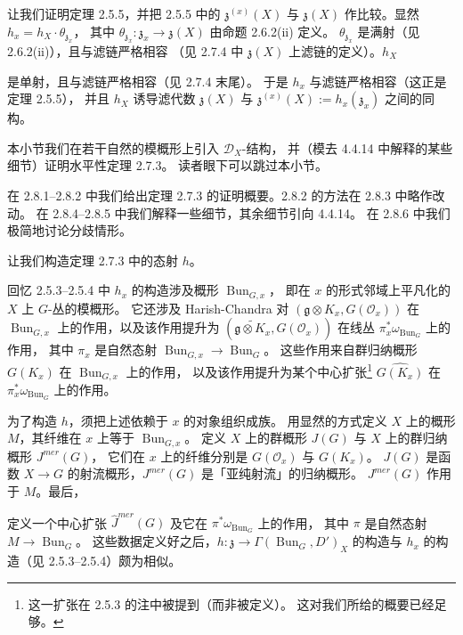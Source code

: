  让我们证明定理 2.5.5，并把 2.5.5 中的 $\mathfrak{z}^{(x)}(X)$
与 $\mathfrak{z}(X)$ 作比较。显然 $h_x=h_X\cdot\theta_{\mathfrak{z}_x}$，
其中 $\theta_{\mathfrak{z}_x}:\mathfrak{z}_x\to\mathfrak{z}(X)$ 由命题 2.6.2(ii) 定义。
$\theta_{\mathfrak{z}_x}$ 是满射（见 2.6.2(ii)），且与滤链严格相容
（见 2.7.4 中 $\mathfrak{z}(X)$ 上滤链的定义）。$h_X$


是单射，且与滤链严格相容（见 2.7.4 末尾）。
于是 $h_x$ 与滤链严格相容（这正是定理 2.5.5），
并且 $h_X$ 诱导滤代数 $\mathfrak{z}(X)$ 与
$\mathfrak{z}^{(x)}(X):=h_x(\mathfrak{z}_x)$ 之间的同构。

 本小节我们在若干自然的模概形上引入 $\mathcal{D}_X$-结构，
并（模去 4.4.14 中解释的某些细节）证明水平性定理 2.7.3。
读者眼下可以跳过本小节。

在 2.8.1--2.8.2 中我们给出定理 2.7.3 的证明概要。2.8.2 的方法在 2.8.3 中略作改动。
在 2.8.4--2.8.5 中我们解释一些细节，其余细节引向 4.4.14。
在 2.8.6 中我们极简地讨论分歧情形。

 让我们构造定理 2.7.3 中的态射 $h$。

回忆 2.5.3--2.5.4 中 $h_x$ 的构造涉及概形 $\operatorname{Bun}_{G,x}$，
即在 $x$ 的形式邻域上平凡化的 $X$ 上 $G$-丛的模概形。
它还涉及 Harish-Chandra 对 $(\mathfrak{g}\otimes K_x,G(\mathcal{O}_x))$
在 $\operatorname{Bun}_{G,x}$ 上的作用，以及该作用提升为
$(\widetilde{\mathfrak{g}\otimes K_x},G(\mathcal{O}_x))$ 在线丛
$\pi_x^*\omega_{\operatorname{Bun}_G}$ 上的作用，
其中 $\pi_x$ 是自然态射 $\operatorname{Bun}_{G,x}\to\operatorname{Bun}_G$。
这些作用来自群归纳概形 $G(K_x)$ 在 $\operatorname{Bun}_{G,x}$ 上的作用，
以及该作用提升为某个中心扩张\footnote{这一扩张在 2.5.3 的注中被提到（而非被定义）。
这对我们所给的概要已经足够。} $\widehat{G(K_x)}$ 在
$\pi_x^*\omega_{\operatorname{Bun}_G}$ 上的作用。

为了构造 $h$，须把上述依赖于 $x$ 的对象组织成族。
用显然的方式定义 $X$ 上的概形 $M$，其纤维在 $x$ 上等于 $\operatorname{Bun}_{G,x}$。
定义 $X$ 上的群概形 $J(G)$ 与 $X$ 上的群归纳概形 $J^{mer}(G)$，
它们在 $x$ 上的纤维分别是 $G(\mathcal{O}_x)$ 与 $G(K_x)$。
$J(G)$ 是函数 $X\to G$ 的射流概形，$J^{mer}(G)$ 是「亚纯射流」的归纳概形。
$J^{mer}(G)$ 作用于 $M$。最后，


定义一个中心扩张 $\widehat{J}^{mer}(G)$ 及它在
$\pi^*\omega_{\operatorname{Bun}_G}$ 上的作用，
其中 $\pi$ 是自然态射 $M\to\operatorname{Bun}_G$。
这些数据定义好之后，$h:\mathfrak{z}\to\Gamma(\operatorname{Bun}_G,D')_X$
的构造与 $h_x$ 的构造（见 2.5.3--2.5.4）颇为相似。

